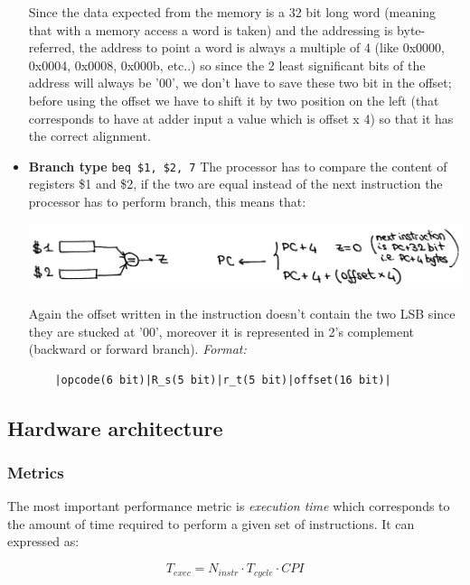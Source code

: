 \begin{itemize}
    Since the data expected from the memory is a 32 bit long word (meaning that with a memory access a word is taken) and the addressing is byte-referred, the address to point a word is always a multiple of 4 (like 0x0000, 0x0004, 0x0008, 0x000b, etc..) so since the 2 least significant bits of the address will always be '00', we don't have to save these two bit in the offset; before using the offset we have to shift it by two position on the left (that corresponds to have at adder input a value which is offset x 4) so that it has the correct alignment.

  \item \textbf{Branch type}
    \verb|beq $1, $2, 7|
    The processor has to compare the content of registers \$1 and \$2, if the two are equal instead of the next instruction the processor has to perform branch, this means that:
    \begin{center}
      \includegraphics[width=0.85\linewidth]{img/img3/2}
    \end{center}

    Again the offset written in the instruction doesn't contain the two LSB since they are stucked at '00', moreover it is represented in 2's complement (backward or forward branch).
    \textit{Format:}
    \begin{verbatim}
    |opcode(6 bit)|R_s(5 bit)|r_t(5 bit)|offset(16 bit)|
    \end{verbatim}

\end{itemize}

\subsection{Hardware architecture}

\subsubsection{Metrics}
The most important performance metric is \textit{execution time} which corresponds to the amount of time required to perform a given set of instructions. It can expressed as:

\begin{equation*}
T_{exec}= N_{instr} \cdot T_{cycle} \cdot CPI
\end{equation*}

